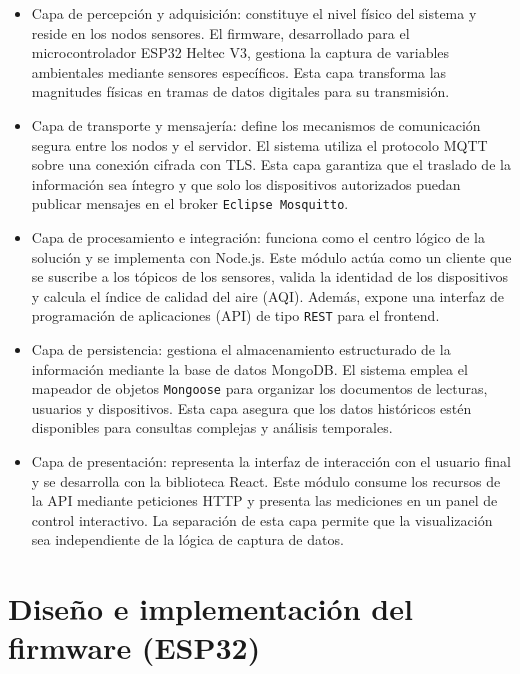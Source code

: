 \begin{itemize}
    \item Capa de percepción y adquisición: constituye el nivel físico del sistema y reside en los nodos sensores. El firmware, desarrollado para el microcontrolador ESP32 Heltec V3, gestiona la captura de variables ambientales mediante sensores específicos. Esta capa transforma las magnitudes físicas en tramas de datos digitales para su transmisión.
    
    \item Capa de transporte y mensajería: define los mecanismos de comunicación segura entre los nodos y el servidor. El sistema utiliza el protocolo MQTT sobre una conexión cifrada con TLS. Esta capa garantiza que el traslado de la información sea íntegro y que solo los dispositivos autorizados puedan publicar mensajes en el broker \texttt{Eclipse Mosquitto}.
    
    \item Capa de procesamiento e integración: funciona como el centro lógico de la solución y se implementa con Node.js. Este módulo actúa como un cliente que se suscribe a los tópicos de los sensores, valida la identidad de los dispositivos y calcula el índice de calidad del aire (AQI). Además, expone una interfaz de programación de aplicaciones (API) de tipo \texttt{REST} para el frontend.
    
    \item Capa de persistencia: gestiona el almacenamiento estructurado de la información mediante la base de datos MongoDB. El sistema emplea el mapeador de objetos \texttt{Mongoose} para organizar los documentos de lecturas, usuarios y dispositivos. Esta capa asegura que los datos históricos estén disponibles para consultas complejas y análisis temporales.
    
    \item Capa de presentación: representa la interfaz de interacción con el usuario final y se desarrolla con la biblioteca React. Este módulo consume los recursos de la API mediante peticiones HTTP y presenta las mediciones en un panel de control interactivo. La separación de esta capa permite que la visualización sea independiente de la lógica de captura de datos.
\end{itemize}

\section{Diseño e implementación del firmware (ESP32)}

